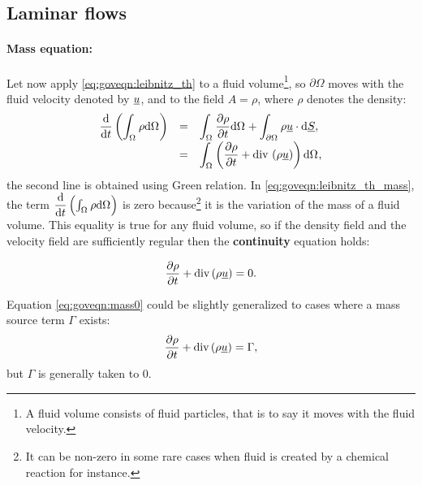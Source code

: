 \subsection{Laminar flows}
\paragraph{Mass equation:}
Let now apply \eqref{eq:goveqn:leibnitz_th} to a fluid volume\footnote{%
A fluid volume consists of fluid particles, that is to say it moves with the fluid velocity.
},
so $\partial \Omega$ moves with the fluid velocity denoted by $\underline{u}$, and to the field
$A= \rho$, where $\rho$ denotes the density:
%
 \begin{equation}\label{eq:goveqn:leibnitz_th_mass}
\begin{array}{r c l}
\displaystyle \dfrac{\mathrm{d} }{\mathrm{d} t} \left( \int_{\Omega_{}} \rho \mathrm{d} \Omega_{}\right) &=&
\displaystyle \int_{\Omega_{}} \dfrac{\partial \rho}{\partial t} \mathrm{d} \Omega_{} + \int_{\partial \Omega_{}} \rho  \underline{u} \cdot  \mathrm{d} \underline{S}, \\
\displaystyle &=&
\displaystyle \int_{\Omega_{ }} \left( \dfrac{\partial \rho}{\partial t} + \text{div}\, \left( \rho \underline{u} \right) \right) \mathrm{d} \Omega_{},
\end{array}
 \end{equation}
the second line is obtained using Green relation. In \eqref{eq:goveqn:leibnitz_th_mass}, the term
$\dfrac{\mathrm{d} }{\mathrm{d} t} \left( \int_{\Omega_{} }\rho \mathrm{d} \Omega_{}\right) $ is zero because\footnote{%
It can be non-zero in some rare cases when fluid is created by a chemical reaction for instance.
}
 it is the variation of the mass of a fluid volume. This equality is true for any fluid volume, so
 if the density field and the velocity field are sufficiently regular then the \textbf{continuity} equation holds:

\begin{equation}\label{eq:goveqn:mass0}
\dfrac{\partial \rho}{\partial t} + \text{div}\,(\rho \underline{u})=0.
\end{equation}

Equation \eqref{eq:goveqn:mass0} could be slightly generalized to cases where a mass source term $\Gamma$
exists:
\begin{equation}\label{eq:goveqn:mass}
\dfrac{\partial \rho}{\partial t} + \text{div}\,(\rho \underline{u})=\Gamma,
\end{equation}
but $\Gamma$ is generally taken to $0$.

